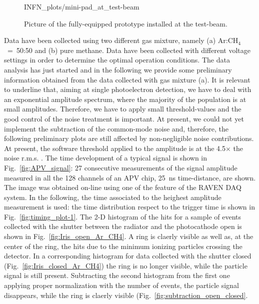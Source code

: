 \begin{enumerate}
\begin{figure}
\begin{center}
                			{INFN_plots/mini-pad_at_test-beam}
				\caption{\label{fig:mini-pad_at_test-beam}
                Picture of the fully-equipped prototype 
                		installed at the
                test-beam.
                }
			\end{center}
            \end{figure} 
       Data have been collected using two different gas mixture, 
       namely (a) Ar:CH$_4$~=~50:50 and (b) pure methane. Data have 
       been collected with different voltage settings in order 
       to determine the 
       optimal operation conditions. The data analysis has just 
       started and in the following we provide some preliminary 
       information obtained from the data collected with gas 
       mixture (a). It is relevant to underline that, aiming at single 
       photoelectron detection, we have to deal with an exponential 
       amplitude spectrum, where the majority of the population is 
       at small amplitudes. Therefore, we have to apply small 
       threshold-values and the good control of the noise treatment  
       is important. At present, we could not yet implement the 
       subtraction of the common-mode noise and, therefore, the 
       following preliminary plots are still affected by 
       non-negligible noise contributions. At present, the software threshold applied to the amplitude is at the 4.5$\times$ the noise r.m.s. .
       The time development of a typical signal is shown in Fig.~\ref{fig:APV_signal}:  27 consecutive measurements of the signal amplitude measured in all the 128 channels of an APV chip, 25~ns time-distance,  are shown. The image was obtained on-line using one of the feature of the RAVEN DAQ system.  In the following, the time associated to the heighest amplitude measurement is used: the time distribution respect to the trigger time is shown in Fig.~\ref{fig:timing_plot-1}. %
       The 2-D histogram of the hits for a sample of events collected with the shutter between the radiator and the photocathode open is shown in Fig.~\ref{fig:Iris_open_Ar_CH4}. A ring is claerly visible as well as, at the center of the ring, the hits due to the minimum ionizing particles crossing the detector. In a corresponding histogram for data collected with the shutter closed (Fig.~\ref{fig:Iris_closed_Ar_CH4}) the ring is no longer visible, while the particle signal is still present. Subtracting the second histogram from the first one applying proper normalization with the number of events, the particle signal disappears, while the ring is claerly visible (Fig.~\ref{fig:subtraction_open_closed}. %

\end{enumerate}
